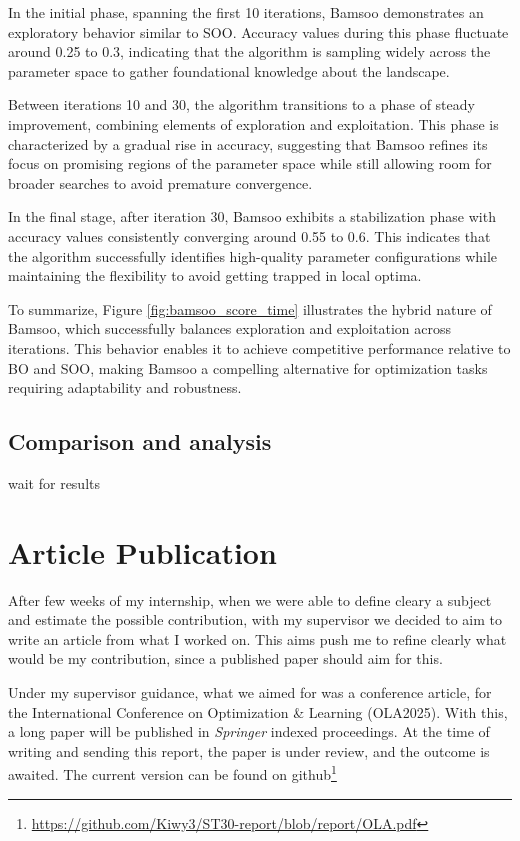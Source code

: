 In the initial phase, spanning the first 10 iterations, Bamsoo demonstrates an exploratory behavior similar to SOO. Accuracy values during this phase fluctuate around 0.25 to 0.3, indicating that the algorithm is sampling widely across the parameter space to gather foundational knowledge about the landscape.

Between iterations 10 and 30, the algorithm transitions to a phase of steady improvement, combining elements of exploration and exploitation. This phase is characterized by a gradual rise in accuracy, suggesting that Bamsoo refines its focus on promising regions of the parameter space while still allowing room for broader searches to avoid premature convergence.

In the final stage, after iteration 30, Bamsoo exhibits a stabilization phase with accuracy values consistently converging around 0.55 to 0.6. This indicates that the algorithm successfully identifies high-quality parameter configurations while maintaining the flexibility to avoid getting trapped in local optima.

To summarize, Figure \ref{fig:bamsoo_score_time} illustrates the hybrid nature of Bamsoo, which successfully balances exploration and exploitation across iterations. This behavior enables it to achieve competitive performance relative to BO and SOO, making Bamsoo a compelling alternative for optimization tasks requiring adaptability and robustness.

\subsection{Comparison and analysis}
\label{sec:exp_analysis}
wait for results

\section{Article Publication}
\label{sec:article}

After few weeks of my internship, when we were able to define cleary a subject and estimate the possible contribution, with my supervisor we decided to aim to write an article from what I worked on. This aims push me to refine clearly what would be my contribution, since a published paper should aim for this. 

Under my supervisor guidance, what we aimed for was a conference article, for the International Conference on Optimization \& Learning (OLA2025). With this, a long paper will be published in \textit{Springer} indexed proceedings. At the time of writing and sending this report, the paper is under review, and the outcome is awaited. The current version can be found on github\footnote{\url{https://github.com/Kiwy3/ST30-report/blob/report/OLA.pdf}}

